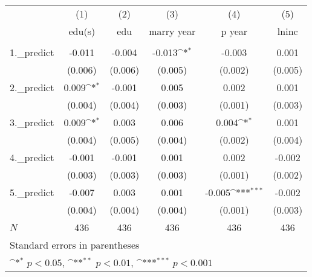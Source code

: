 \documentclass{article}
\begin{document}
{
\def\sym#1{\ifmmode^{#1}\else\(^{#1}\)\fi}
\begin{tabular}{l*{5}{c}}
\hline\hline
            &\multicolumn{1}{c}{(1)}&\multicolumn{1}{c}{(2)}&\multicolumn{1}{c}{(3)}&\multicolumn{1}{c}{(4)}&\multicolumn{1}{c}{(5)}\\
            &\multicolumn{1}{c}{edu(s)} &\multicolumn{1}{c}{edu} &\multicolumn{1}{c}{marry year} &\multicolumn{1}{c}{p year} &\multicolumn{1}{c}{lninc} \\
\hline
       &                     &                     &                     &                     &                     \\
1.\_predict  &      -0.011         &      -0.004         &      -0.013\sym{*}  &      -0.003         &       0.001         \\
            &     (0.006)         &     (0.006)         &     (0.005)         &     (0.002)         &     (0.005)         \\
[1em]
2.\_predict  &       0.009\sym{*}  &      -0.001         &       0.005         &       0.002         &       0.001         \\
            &     (0.004)         &     (0.004)         &     (0.003)         &     (0.001)         &     (0.003)         \\
[1em]
3.\_predict  &       0.009\sym{*}  &       0.003         &       0.006         &       0.004\sym{*}  &       0.001         \\
            &     (0.004)         &     (0.005)         &     (0.004)         &     (0.002)         &     (0.004)         \\
[1em]
4.\_predict  &      -0.001         &      -0.001         &       0.001         &       0.002         &      -0.002         \\
            &     (0.003)         &     (0.003)         &     (0.003)         &     (0.001)         &     (0.002)         \\
[1em]
5.\_predict  &      -0.007         &       0.003         &       0.001         &      -0.005\sym{***}&      -0.002         \\
            &     (0.004)         &     (0.004)         &     (0.004)         &     (0.001)         &     (0.003)         \\
\hline
\(N\)       &         436         &         436         &         436         &         436         &         436         \\
\hline\hline
\multicolumn{6}{l}{\footnotesize Standard errors in parentheses}\\
\multicolumn{6}{l}{\footnotesize \sym{*} \(p<0.05\), \sym{**} \(p<0.01\), \sym{***} \(p<0.001\)}\\
\end{tabular}
}
\end{document}
